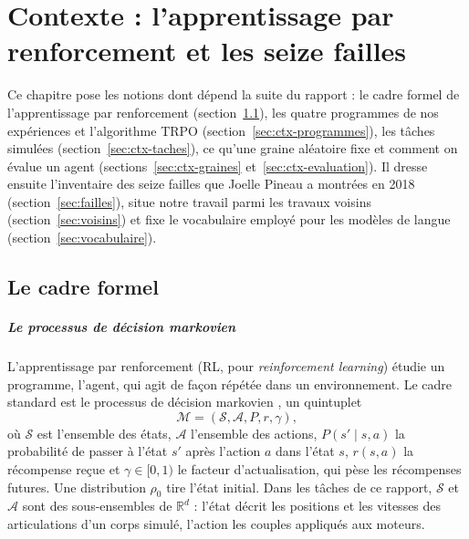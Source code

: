 \chapter{Contexte : l'apprentissage par renforcement et les seize failles}\label{chap:02-contexte}

Ce chapitre pose les notions dont dépend la suite du rapport : le cadre formel de l'apprentissage par
renforcement (section~\ref{sec:cadre}), les quatre programmes de nos expériences et l'algorithme TRPO
(section~\ref{sec:ctx-programmes}), les tâches simulées (section~\ref{sec:ctx-taches}), ce qu'une
graine aléatoire fixe et comment on évalue un agent (sections~\ref{sec:ctx-graines}
et~\ref{sec:ctx-evaluation}). Il dresse ensuite l'inventaire des seize failles que Joelle Pineau a
montrées en 2018 (section~\ref{sec:failles}), situe notre travail parmi les travaux voisins
(section~\ref{sec:voisins}) et fixe le vocabulaire employé pour les modèles de langue
(section~\ref{sec:vocabulaire}).

\section{Le cadre formel}\label{sec:cadre}

\paragraph{Le processus de décision markovien}
L'apprentissage par renforcement (RL, pour \emph{reinforcement learning}) étudie un programme, l'agent,
qui agit de façon répétée dans un environnement. Le cadre standard est le processus de décision
markovien \parencite{puterman1994mdp,sutton2018rl}, un quintuplet
\begin{equation}
  \mathcal{M} = (\mathcal{S}, \mathcal{A}, P, r, \gamma),
\end{equation}
où $\mathcal{S}$ est l'ensemble des états, $\mathcal{A}$ l'ensemble des actions,
$P(s' \mid s, a)$ la probabilité de passer à l'état $s'$ après l'action $a$ dans l'état $s$,
$r(s, a)$ la récompense reçue et $\gamma \in [0, 1)$ le facteur d'actualisation, qui pèse les
récompenses futures. Une distribution $\rho_0$ tire l'état initial. Dans les tâches de ce rapport,
$\mathcal{S}$ et $\mathcal{A}$ sont des sous-ensembles de $\mathbb{R}^d$ : l'état décrit les positions
et les vitesses des articulations d'un corps simulé, l'action les couples appliqués aux moteurs.

